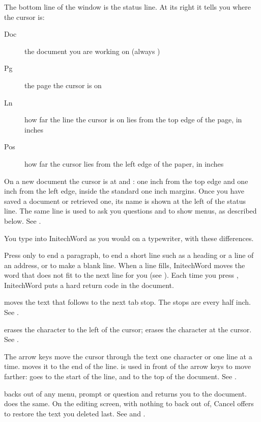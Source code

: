The bottom line of the window is the status line.  At its right it tells
you where the cursor is:
\begin{description}
\item[Doc] the document you are working on (always )
\item[Pg] the page the cursor is on
\item[Ln] how far the line the cursor is on lies from the top edge of the
page, in inches
\item[Pos] how far the cursor lies from the left edge of the paper, in inches
\end{description}
On a new document the cursor is at  and : one inch
from the top edge and one inch from the left edge, inside the standard one
inch margins.  Once you have saved a document or retrieved one, its name is
shown at the left of the status line.  The same line is used to ask you
questions and to show menus, as described below.  See .

You type into InitechWord as you would on a typewriter, with these
differences.

Press  only to end a paragraph, to end a short line such as a
heading or a line of an address, or to make a blank line.  When a line
fills, InitechWord moves the word that does not fit to the next line for
you (see ).  Each time you press , InitechWord
puts a hard return code in the document.

 moves the text that follows to the next tab stop.  The stops are
every half inch.  See .

 erases the character to the left of the cursor; 
erases the character at the cursor.  See .

The arrow keys move the cursor through the text one character or one line
at a time.   moves it to the end of the line.   is used in
front of the arrow keys to move farther:  goes to the start
of the line, and  to the top of the document.  See
.

 backs out of any menu, prompt or question and returns you
to the document.   does the same.  On the editing screen, with
nothing to back out of, Cancel offers to restore the text you deleted last.
See  and .

